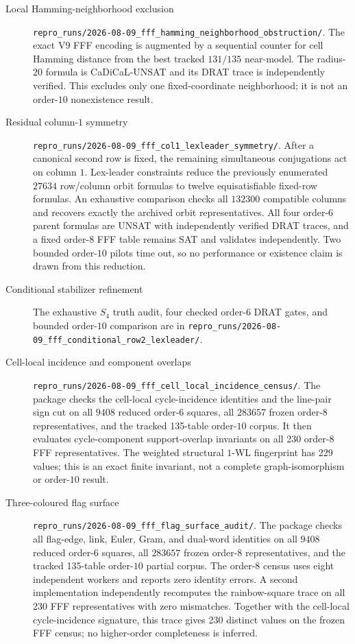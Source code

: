 \begin{description}
\item[Local Hamming-neighborhood exclusion]
\nolinkurl{repro_runs/2026-08-09_fff_hamming_neighborhood_obstruction/}.
The exact V9 FFF encoding is augmented by a sequential counter for cell
Hamming distance from the best tracked $131/135$ near-model.  The radius-$20$
formula is CaDiCaL-UNSAT and its DRAT trace is independently verified.  This
excludes only one fixed-coordinate neighborhood; it is not an order-$10$
nonexistence result.

\item[Residual column-$1$ symmetry]
\nolinkurl{repro_runs/2026-08-09_fff_col1_lexleader_symmetry/}.
After a canonical second row is fixed, the remaining simultaneous
conjugations act on column $1$.  Lex-leader constraints reduce the previously
enumerated $27634$ row/column orbit formulas to twelve equisatisfiable
fixed-row formulas.  An exhaustive comparison checks all $132300$ compatible
columns and recovers exactly the archived orbit representatives.  All four
order-$6$ parent formulas are UNSAT with independently verified DRAT traces,
and a fixed order-$8$ FFF table remains SAT and validates independently.  Two
bounded order-$10$ pilots time out, so no performance or existence claim is
drawn from this reduction.

\item[Conditional stabilizer refinement]
The exhaustive $S_4$ truth audit,
four checked order-$6$ DRAT gates, and bounded order-$10$ comparison are in
\nolinkurl{repro_runs/2026-08-09_fff_conditional_row2_lexleader/}.

\item[Cell-local incidence and component overlaps]
\nolinkurl{repro_runs/2026-08-09_fff_cell_local_incidence_census/}.
The package checks the cell-local cycle-incidence identities and the
line-pair sign cut on all $9408$ reduced
order-$6$ squares, all $283657$ frozen order-$8$ representatives, and the
tracked 135-table order-$10$ corpus.  It then evaluates cycle-component
support-overlap invariants on all 230 order-$8$ FFF representatives.  The
weighted structural $1$-WL fingerprint has 229 values; this is an exact
finite invariant, not a complete graph-isomorphism or order-$10$ result.

\item[Three-coloured flag surface]
\nolinkurl{repro_runs/2026-08-09_fff_flag_surface_audit/}.
The package checks all flag-edge, link, Euler, Gram, and dual-word identities
on all $9408$ reduced order-$6$ squares, all $283657$ frozen order-$8$
representatives, and the tracked 135-table order-$10$ partial corpus.  The
order-$8$ census uses eight independent workers and reports zero identity
errors.  A second implementation independently recomputes the rainbow-square
trace on all 230 FFF representatives with zero mismatches.  Together with
the cell-local cycle-incidence signature, this trace gives 230 distinct
values on the frozen FFF
census; no higher-order completeness is inferred.


\end{description}
